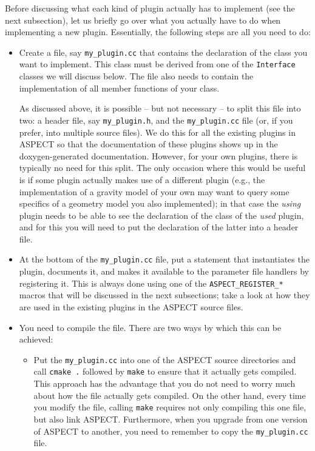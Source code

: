\documentclass{article}
\newcommand{\aspect}{\textsc{ASPECT}}
\begin{document}
Before discussing what each kind of plugin actually has to implement (see the
next subsection), let us briefly go over what you actually have to do when
implementing a new plugin. Essentially, the following steps are all you need to
do:
\begin{itemize}
  \item Create a file, say \texttt{my\_plugin.cc} that contains the declaration
  of the class you want to implement. This class must be derived from one of the
  \texttt{Interface} classes we will discuss below. The file also needs to
  contain the implementation of all member functions of your class.

  As discussed above, it is possible -- but not necessary -- to split this file
  into two: a header file, say \texttt{my\_plugin.h}, and the
  \texttt{my\_plugin.cc} file (or, if you prefer, into multiple source files).
  We do this for all the existing plugins in \aspect{} so that the documentation
  of these plugins shows up in the
  doxygen-generated documentation. However, for your own plugins, there is
  typically no need for this split. The only occasion where this would be useful
  is if some plugin actually makes use of a different plugin (e.g., the
  implementation of a gravity model of your own may want to query some
  specifics of a geometry model you also implemented); in that case the
  \textit{using} plugin needs to be able to see the declaration of the class of
  the \textit{used} plugin, and for this you will need to put the declaration of
  the latter into a header file.

  \item At the bottom of the \texttt{my\_plugin.cc} file, put a statement that
  instantiates the plugin, documents it, and makes it available to the parameter
  file handlers by registering it. This is always done using one of the
  \texttt{ASPECT\_REGISTER\_*} macros that will be discussed in the next
  subsections; take a look at how they are used in the existing plugins in the
  \aspect{} source files.

  \item You need to compile the file. There are two ways by which this can be
  achieved:
  \begin{itemize}
    \item Put the \texttt{my\_plugin.cc} into one of the \aspect{} source
    directories and call \texttt{cmake .} followed by \texttt{make} to ensure
    that it actually gets compiled. This approach has the advantage that you do
    not need to worry much about how the file actually gets compiled. On the
    other hand, every time you modify the file, calling \texttt{make} requires
    not only compiling this one file, but also link \aspect{}. Furthermore, when
    you upgrade from one version of \aspect{} to another, you need to remember
    to copy the \texttt{my\_plugin.cc} file.


\end{itemize}
\end{itemize}
\end{document}
